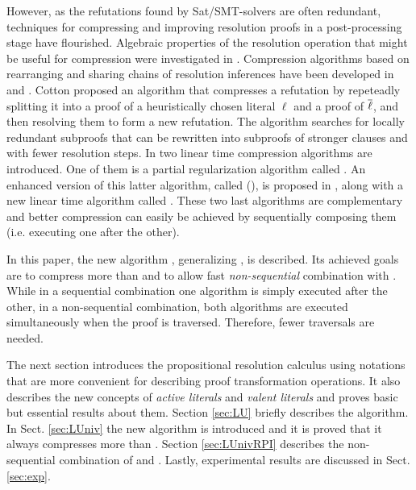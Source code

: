 \documentclass{llncs}
\begin{document}
However, as the refutations found by Sat/SMT-solvers are often redundant, techniques for
compressing and improving resolution proofs in a post-processing stage have flourished.  Algebraic properties of the resolution
operation that might be useful for compression were investigated in \cite{bwp10}.
Compression algorithms based on rearranging and sharing chains of resolution inferences have been
developed in \cite{Amjad07} and \cite{Sinz}.  Cotton \cite{CottonSplit} proposed an algorithm that
compresses a refutation by repeteadly splitting it into a proof of a heuristically chosen literal $\ell$
and a proof of $\overline{\ell}$, and then resolving them to form a new refutation.  The {\ReduceReconstruct} algorithm \cite{RedRec} searches for locally redundant
subproofs that can be rewritten into subproofs of stronger clauses and with fewer resolution steps.
In \cite{RP08} two linear time compression algorithms are introduced. One of them is a partial
regularization algorithm called {\RecyclePivots}.  An enhanced version of this latter
algorithm, called {\RecyclePivotsIntersection} ({\RPI}), is proposed in \cite{LURPI},
along with a new linear time algorithm called {\LowerUnits}.  These two last algorithms are
complementary and better compression can easily be achieved by sequentially composing them (i.e.
executing one after the other).

In this paper, the new algorithm {\LowerUnivalents}, generalizing {\LowerUnits}, is described. Its achieved
goals are to compress more than {\LowerUnits} and to allow fast \emph{non-sequential}  combination
with {\RPI}. While in a sequential combination one algorithm is simply executed after the other, in
a non-sequential combination, both algorithms are executed simultaneously when the proof is
traversed. Therefore, fewer traversals are needed.

The next section introduces the propositional resolution calculus using notations that are more convenient for describing proof transformation operations. It also describes the new concepts of \emph{active literals} and \emph{valent literals} and proves basic but essential results about them. Section \ref{sec:LU} briefly describes
the {\LowerUnits} algorithm. In Sect. \ref{sec:LUniv} the new algorithm {\LowerUnivalents} is
introduced and it is proved that it always compresses more than {\LowerUnits}. Section
\ref{sec:LUnivRPI} describes the non-sequential combination of {\LowerUnivalents} and {\RPI}.
Lastly, experimental results are discussed in Sect. \ref{sec:exp}.


\newcommand{\freevar}[1]{\mathrm{FV}(#1)}
\end{document}
